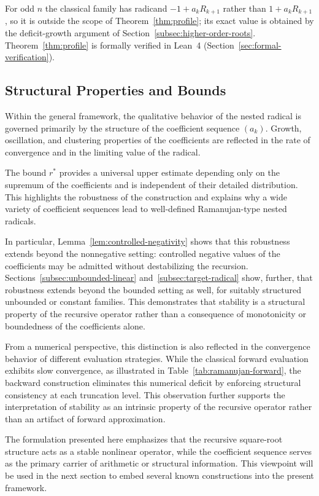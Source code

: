\documentclass[11pt,a4paper]{amsart}
\theoremstyle{plain}
\theoremstyle{definition}
\theoremstyle{remark}
\begin{document}
For odd $n$ the classical family has radicand $-1+a_kR_{k+1}$ rather than $1+a_kR_{k+1}$, so it is outside the scope of Theorem~\ref{thm:profile}; its exact value is obtained by the deficit-growth argument of Section~\ref{subsec:higher-order-roots}. Theorem~\ref{thm:profile} is formally verified in Lean~4 (Section~\ref{sec:formal-verification}).

\subsection{Structural Properties and Bounds}
\label{subsec:structural-bounds}

Within the general framework, the qualitative behavior of the nested radical is governed primarily by the structure of the coefficient sequence $(a_k)$. Growth, oscillation, and clustering properties of the coefficients are reflected in the rate of convergence and in the limiting value of the radical.

The bound $r^{\ast}$ provides a universal upper estimate depending only on the supremum of the coefficients and is independent of their detailed distribution. This highlights the robustness of the construction and explains why a wide variety of coefficient sequences lead to well-defined Ramanujan-type nested radicals.

In particular, Lemma~\ref{lem:controlled-negativity} shows that this robustness extends beyond the nonnegative setting: controlled negative values of the coefficients may be admitted without destabilizing the recursion. Sections~\ref{subsec:unbounded-linear} and~\ref{subsec:target-radical} show, further, that robustness extends beyond the bounded setting as well, for suitably structured unbounded or constant families. This demonstrates that stability is a structural property of the recursive operator rather than a consequence of monotonicity or boundedness of the coefficients alone.

From a numerical perspective, this distinction is also reflected in the convergence behavior of different evaluation strategies. While the classical forward evaluation exhibits slow convergence, as illustrated in Table~\ref{tab:ramanujan-forward}, the backward construction eliminates this numerical deficit by enforcing structural consistency at each truncation level. This observation further supports the interpretation of stability as an intrinsic property of the recursive operator rather than an artifact of forward approximation.

The formulation presented here emphasizes that the recursive square-root structure acts as a stable nonlinear operator, while the coefficient sequence serves as the primary carrier of arithmetic or structural information. This viewpoint will be used in the next section to embed several known constructions into the present framework.
\end{document}
